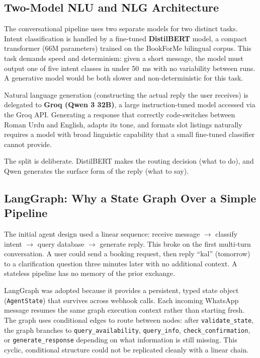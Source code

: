 \subsection{Two-Model NLU and NLG Architecture}

The conversational pipeline uses two separate models for two distinct tasks. Intent classification is handled by a fine-tuned \textbf{DistilBERT} model, a compact transformer (66M parameters) trained on the BookForMe bilingual corpus. This task demands speed and determinism: given a short message, the model must output one of five intent classes in under 50~ms with no variability between runs. A generative model would be both slower and non-deterministic for this task.

Natural language generation (constructing the actual reply the user receives) is delegated to \textbf{Groq (Qwen 3 32B)}, a large instruction-tuned model accessed via the Groq API. Generating a response that correctly code-switches between Roman Urdu and English, adapts its tone, and formats slot listings naturally requires a model with broad linguistic capability that a small fine-tuned classifier cannot provide.

The split is deliberate. DistilBERT makes the routing decision (what to do), and Qwen generates the surface form of the reply (what to say).

\subsection{LangGraph: Why a State Graph Over a Simple Pipeline}

The initial agent design used a linear sequence: receive message $\to$ classify intent $\to$ query database $\to$ generate reply. This broke on the first multi-turn conversation. A user could send a booking request, then reply ``kal'' (tomorrow) to a clarification question three minutes later with no additional context. A stateless pipeline has no memory of the prior exchange.

LangGraph was adopted because it provides a persistent, typed state object (\texttt{AgentState}) that survives across webhook calls. Each incoming WhatsApp message resumes the same graph execution context rather than starting fresh. The graph uses conditional edges to route between nodes: after \texttt{validate\_state}, the graph branches to \texttt{query\_availability}, \texttt{query\_info}, \texttt{check\_confirmation}, or \texttt{generate\_response} depending on what information is still missing. This cyclic, conditional structure could not be replicated cleanly with a linear chain.

